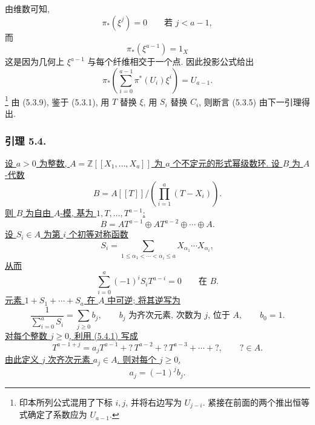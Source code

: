 由维数可知,
\[
\pi_*(\xi^j)=0\qquad\text{若 }j<a-1,
\]
而
\[
\pi_*(\xi^{a-1})=1_X
\]
这是因为几何上 $\xi^{a-1}$ 与每个纤维相交于一个点. 因此投影公式给出
\begin{equation}\tag{5.3.9}
\pi_*\!\left(
\sum_{i=0}^{a-1}\pi^*(U_i)\xi^i
\right)=U_{a-1}.
\end{equation}
\footnote{印本所列公式混用了下标 $i,j$, 并将右边写为 $U_{j-i}$. 紧接在前面的两个推出恒等式确定了系数应为 $U_{a-1}$.}
由 (5.3.9), 鉴于 (5.3.1), 用 $T$ 替换 $\xi$, 用 $S_i$ 替换 $C_i$, 则断言 (5.3.5) 由下一引理得出.

\subsubsection*{引理 5.4.}
\underline{设 $a>0$ 为整数, $A=\mathbb Z[[X_1,\ldots,X_a]]$ 为 $a$ 个不定元的形式幂级数环. 设 $B$ 为 $A$-代数}
\[
B=A[[T]]\bigg/\left(\prod_{i=1}^{a}(T-X_i)\right).
\]
\underline{则 $B$ 为自由 $A$-模, 基为 $1,T,\ldots,T^{a-1}$:}
\begin{equation}\tag{5.4.1}
B=AT^{a-1}\oplus AT^{a-2}\oplus\cdots\oplus A.
\end{equation}
\underline{设 $S_i\in A$ 为第 $i$ 个初等对称函数}
\[
S_i=\sum_{1\leq\alpha_1<\cdots<\alpha_i\leq a}
X_{\alpha_1}\cdots X_{\alpha_i},
\]
\underline{从而}
\begin{equation}\tag{5.4.2}
\sum_{i=0}^{a}(-1)^iS_iT^{a-i}=0
\qquad\text{在 }B.
\end{equation}
\underline{元素 $1+S_1+\cdots+S_a$ 在 $A$ 中可逆; 将其逆写为}
\begin{equation}\tag{5.4.3}
\frac{1}{\sum_{i=0}^{a}S_i}
=\sum_{j\geq0}b_j,
\qquad
b_j\text{ 为齐次元素, 次数为 }j\text{, 位于 }A,
\qquad b_0=1.
\end{equation}
\underline{对每个整数 $j\geq0$, 利用 (5.4.1) 写成}
\begin{equation}\tag{5.4.4}
T^{a-1+j}
=a_jT^{a-1}+{}?\,T^{a-2}+{}?\,T^{a-3}+\cdots+{}?,
\qquad ?\in A.
\end{equation}
\underline{由此定义 $j$ 次齐次元素 $a_j\in A$. 则对每个 $j\geq0$,}
\begin{equation}\tag{5.4.5}
a_j=(-1)^jb_j.
\end{equation}

